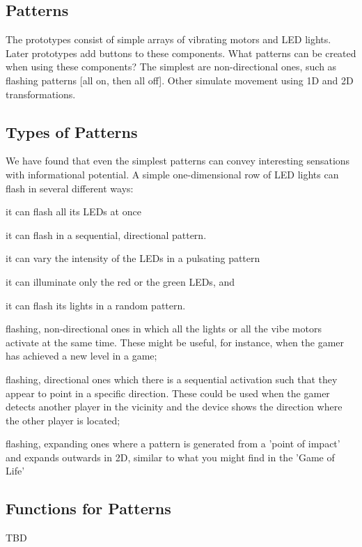 \documentclass{chi-ext}
\begin{document}
\subsection{Patterns}
The prototypes consist of simple arrays of vibrating motors and LED lights. Later prototypes add buttons to these components. What patterns can be created when using these components? The simplest are non-directional ones, such as flashing patterns [all on, then all off]. Other simulate movement using 1D and 2D transformations.

\subsection{Types of Patterns}
We have found that even the simplest patterns can convey interesting sensations with informational potential. A simple one-dimensional row of LED lights can flash in several different ways: \begin{inparaenum}
\item it can flash all its LEDs at once
\item it can flash in a sequential, directional pattern. 
\item it can vary the intensity of the LEDs in a pulsating pattern
\item it can illuminate only the red or the green LEDs, and
\item it can flash its lights in a random pattern. 
\end{inparaenum}

\begin{inparaenum}
\item flashing, non-directional ones in which all the lights or all the vibe motors activate at the same time. These might be useful, for instance, when the gamer has achieved a new level in a game;
\item flashing, directional ones which there is a sequential activation such that they appear to point in a specific direction. These could be used when the gamer detects another player in the vicinity and the device shows the direction where the other player is located;
\item flashing, expanding ones where a pattern is generated from a 'point of impact' and expands outwards in 2D, similar to what you might find in the 'Game of Life'
\end{inparaenum}

\subsection{Functions for Patterns}
TBD
\end{document}
